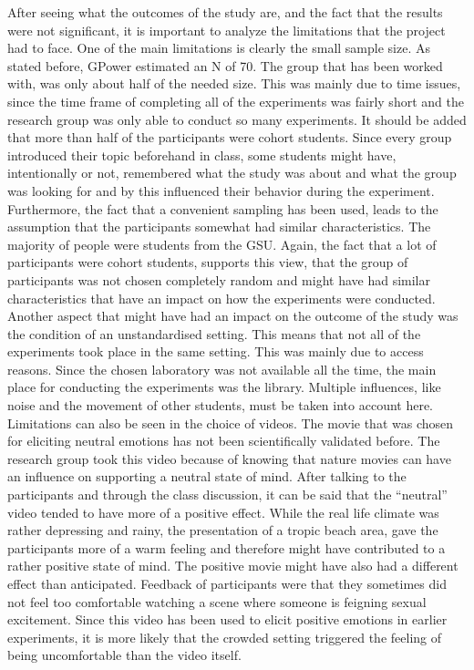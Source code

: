 \documentclass[	
	12pt, %
	a4paper, %
  abstracton
]{scrartcl}\usepackage[]{graphicx}\usepackage[]{color}
\begin{document}
After seeing what the outcomes of the study are, and the fact that the results were not significant, it is important to analyze the limitations that the project had to face. One of the main limitations is clearly the small sample size. As stated before, GPower estimated an N of 70. The group that has been worked with, was only about half of the needed size. This was mainly due to time issues, since the time frame of completing all of the experiments was fairly short and the research group was only able to conduct so many experiments. 
It should be added that more than half of the participants were cohort students. Since every group introduced their topic beforehand in class, some students might have, intentionally or not, remembered what the study was about and what the group was looking for and by this influenced their behavior during the experiment. 
Furthermore, the fact that a convenient sampling has been used, leads to the assumption that the participants somewhat had similar characteristics. The majority of people were students from the GSU. Again, the fact that a lot of participants were cohort students, supports this view, that the group of participants was not chosen completely random and might have had similar characteristics that have an impact on how the experiments were conducted.
Another aspect that might have had an impact on the outcome of the study was the condition of an unstandardised setting. This means that not all of the experiments took place in the same setting. This was mainly due to access reasons. Since the chosen laboratory was not available all the time, the main place for conducting the experiments was the library. Multiple influences, like noise and the movement of other students, must be taken into account here. 
Limitations can also be seen in the choice of videos. The movie that was chosen for eliciting neutral emotions has not been scientifically validated before. The research group took this video because of knowing that nature movies can have an influence on supporting a neutral state of mind. After talking to the participants and through the class discussion, it can be said that the “neutral” video tended to have more of a positive effect. While the real life climate was rather depressing and rainy, the presentation of a tropic beach area, gave the participants more of a warm feeling and therefore might have contributed to a rather positive state of mind. The positive movie might have also had a different effect than anticipated. Feedback of participants were that they sometimes did not feel too comfortable watching a scene where someone is feigning sexual excitement. Since this video has been used to elicit positive emotions in earlier experiments, it is more likely that the crowded setting triggered the feeling of being uncomfortable than the video itself.
\end{document}
